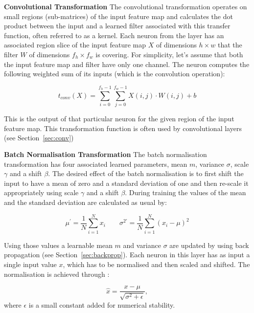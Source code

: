 \textbf{Convolutional Transformation}
\label{section:conv}
The convolutional transformation operates on small regions (sub-matrices) of the input feature map and calculates the dot product between the input and a learned filter associated with this transfer function, often referred to as a kernel. Each neuron from the layer has an associated region slice of the input feature map $X$ of dimensions $h \times w$ that the filter $W$ of dimensions \( f_h \times f_w \) is covering. For simplicity, let's assume that both the input feature map and filter have only one channel. The neuron computes the following weighted sum of its inputs (which is the convolution operation):

\begin{equation}
t_{conv}(X) = \sum_{i=0}^{f_h - 1} \sum_{j=0}^{f_w - 1} X(i, j) \cdot W(i, j) + b
\label{eq:conv}
\end{equation}

This is the output of that particular neuron for the given region of the input feature map. This transformation function is often used by convolutional layers (see Section~\ref{sec:conv})

\textbf{Batch Normalisation Transformation}
The batch normalisation transformation has four associated learned parameters, mean $m$, variance $\sigma$, scale $\gamma$ and a shift $\beta$. The desired effect of the batch normalisation is to first shift the input to have a mean of zero and a standard deviation of one and then re-scale it appropriately using scale $\gamma$ and a shift $\beta$.
During training the values of the mean and the standard deviation are calculated as usual by:

\begin{equation}
\mu^\prime = \frac{1}{N} \sum_{i=1}^{N} x_i \qquad \sigma^{2\prime} = \frac{1}{N} \sum_{i=1}^{N} (x_i - \mu)^2
\end{equation}

Using those values a learnable mean $m$ and variance $\sigma$ are updated by using back propagation (see Section~\ref{sec:backprop}). Each neuron in this layer has as input a single input value $x$, which has to be normalised and then scaled and shifted. The normalisation is achieved through :

\begin{equation}
\hat{x} = \frac{x - \mu}{\sqrt{\sigma^2 + \epsilon}},
\end{equation}
where $\epsilon $ is a small constant added for numerical stability.

